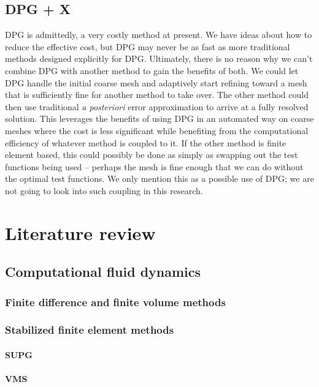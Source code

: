 \documentclass[Proposal.tex]{subfiles}
\begin{document}
\subsection{DPG + X}
DPG is admittedly, a very costly method at present. 
We have ideas about how to reduce the effective cost, but DPG may never be as fast as more traditional methods designed explicitly for DPG.
Ultimately, there is no reason why we can't combine DPG with another method to gain the benefits of both.
We could let DPG handle the initial coarse mesh and adaptively start refining toward a mesh that is sufficiently fine for another method to take over.
The other method could then use traditional \emph{a posteriori} error approximation to arrive at a fully resolved solution.
This leverages the benefits of using DPG in an automated way on coarse meshes where the cost is less significant while benefiting from the 
computational efficiency of whatever method is coupled to it.
If the other method is finite element based, this could possibly be done as simply as swapping out the test functions being used 
-- perhaps the mesh is fine enough that we can do without the optimal test functions.
We only mention this as a possible use of DPG; we are not going to look into such coupling in this research.

\section{Literature review}

\subsection{Computational fluid dynamics}

\subsubsection{Finite difference and finite volume methods}

\subsubsection{Stabilized finite element methods}
\paragraph{SUPG}
\paragraph{VMS}
\end{document}
